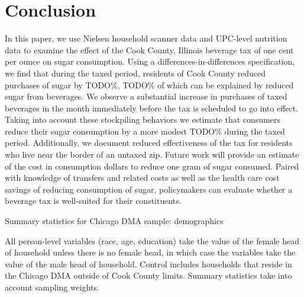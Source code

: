 \documentclass[12pt]{article}
\begin{document}

\section{Conclusion} \label{conclusion}

In this paper, we use Nielsen household scanner data and UPC-level nutrition data to examine the effect of the Cook County, Illinois beverage tax of one cent per ounce on sugar consumption. Using a differences-in-differences specification, we find that during the taxed period, residents of Cook County reduced purchases of sugar by TODO\%, TODO\% of which can be explained by reduced sugar from beverages. We observe a substantial increase in purchases of taxed beverages in the month immediately before the tax is scheduled to go into effect. Taking into account these stockpiling behaviors we estimate that consumers reduce their sugar consumption by a more modest TODO\% during the taxed period. Additionally, we document reduced effectiveness of the tax for residents who live near the border of an untaxed zip. Future work will provide an estimate of the cost in consumption dollars to reduce one gram of sugar consumed. Paired with knowledge of transfers and related costs as well as the health care cost savings of reducing consumption of sugar, policymakers can evaluate whether a beverage tax is well-suited for their constituents.





\clearpage
\printbibliography


\singlespacing
\clearpage
\begin{table}
\caption{Summary statistics for Chicago DMA sample: demographics}
\label{summary_table}

\footnotesize{All person-level variables (race, age, education) take the value of the female head of household unless there is no female head, in which case the variables take the value of the male head of household. Control includes households that reside in the Chicago DMA outside of Cook County limits. Summary statistics take into account sampling weights.}
\end{table}


\clearpage


\clearpage

\end{document}
